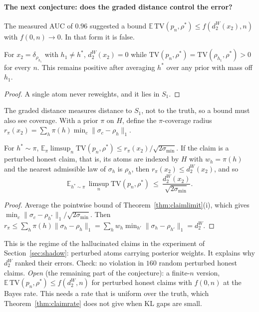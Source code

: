 \paragraph{The next conjecture: does the graded distance control the error?} The measured AUC of $0.96$ suggested a bound $\mathbb E\,\mathrm{TV}(p_n,\rho^*)\le f(d_2^W(x_2),n)$ with $f(0,n)\to0$. In that form it is false.
\begin{proposition}\label{prop:noweighted}
For $x_2=\delta_{\rho_{h_1}}$ with $h_1\ne h^*$, $d_2^W(x_2)=0$ while $\mathrm{TV}(p_n,\rho^*)=\mathrm{TV}(\rho_{h_1},\rho^*)>0$ for every $n$. This remains positive after averaging $h^*$ over any prior with mass off $h_1$.
\end{proposition}
\begin{proof}
A single atom never reweights, and it lies in $S_1$.
\end{proof}
The graded distance measures distance to $S_1$, not to the truth, so a bound must also see coverage. With a prior $\pi$ on $H$, define the $\pi$-coverage radius $r_\pi(x_2)=\sum_h\pi(h)\min_c\|\sigma_c-\rho_h\|_1$.
\begin{proposition}\label{prop:coverpi}
For $h^*\sim\pi$, $\mathbb E_\pi\limsup_n\mathrm{TV}(p_n,\rho^*)\le r_\pi(x_2)/\sqrt{2\sigma_{\min}}$. If the claim is a perturbed honest claim, that is, its atoms are indexed by $H$ with $w_h=\pi(h)$ and the nearest admissible law of $\sigma_h$ is $\rho_h$, then $r_\pi(x_2)\le d_2^W(x_2)$, and so
\[\mathbb E_{h^*\sim\pi}\,\limsup_n\mathrm{TV}(p_n,\rho^*)\ \le\ \frac{d_2^W(x_2)}{\sqrt{2\sigma_{\min}}}.\]
\end{proposition}
\begin{proof}
Average the pointwise bound of Theorem~\ref{thm:claimlimit}(i), which gives $\min_c\|\sigma_c-\rho_{h^*}\|_1/\sqrt{2\sigma_{\min}}$. Then $r_\pi\le\sum_h\pi(h)\|\sigma_h-\rho_h\|_1=\sum_hw_h\min_{h'}\|\sigma_h-\rho_{h'}\|_1=d_2^W$.
\end{proof}
This is the regime of the hallucinated claims in the experiment of Section~\ref{sec:shadow}: perturbed atoms carrying posterior weights. It explains why $d_2^W$ ranked their errors. Check: no violation in $160$ random perturbed honest claims. \emph{Open} (the remaining part of the conjecture): a finite-$n$ version, $\mathbb E\,\mathrm{TV}(p_n,\rho^*)\le f(d_2^W,n)$ for perturbed honest claims with $f(0,n)$ at the Bayes rate. This needs a rate that is uniform over the truth, which Theorem~\ref{thm:claimrate} does not give when KL gaps are small.

